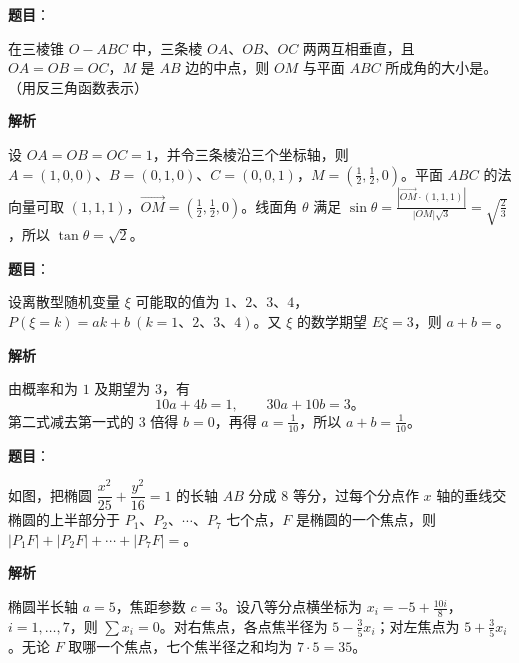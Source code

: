 \begin{answer}

\textbf{题目}：

在三棱锥 $O-ABC$ 中，三条棱 $OA\text{、}OB\text{、}OC$ 两两互相垂直，且 $OA=OB=OC$，$M$ 是 $AB$ 边的中点，则 $OM$ 与平面 $ABC$ 所成角的大小是\gkblank{}。（用反三角函数表示）

\textbf{解析}

设 $OA=OB=OC=1$，并令三条棱沿三个坐标轴，则 $A=(1,0,0)\text{、}B=(0,1,0)\text{、}C=(0,0,1)$，$M=(\frac12,\frac12,0)$。平面 $ABC$ 的法向量可取 $(1,1,1)$，$\overrightarrow{OM}=(\frac12,\frac12,0)$。线面角 $\theta$ 满足 $\sin\theta=\frac{|\overrightarrow{OM}\cdot(1,1,1)|}{|OM|\sqrt3}=\sqrt{\frac23}$，所以 $\tan\theta=\sqrt2$。


\end{answer}
\begin{answer}

\textbf{题目}：

设离散型随机变量 $\xi$ 可能取的值为 $1\text{、}2\text{、}3\text{、}4$，$P(\xi=k)=ak+b\ (k=1\text{、}2\text{、}3\text{、}4)$。又 $\xi$ 的数学期望 $E\xi=3$，则 $a+b=$\gkblank{}。

\textbf{解析}

由概率和为 $1$ 及期望为 $3$，有
\nopagebreak[4]
\[
10a+4b=1,\qquad30a+10b=3\mbox{。}
\]
第二式减去第一式的 $3$ 倍得 $b=0$，再得 $a=\frac1{10}$，所以 $a+b=\frac1{10}$。


\end{answer}
\begin{answer}

\textbf{题目}：

如图，把椭圆 $\dfrac{x^2}{25}+\dfrac{y^2}{16}=1$ 的长轴 $AB$ 分成 $8$ 等分，过每个分点作 $x$ 轴的垂线交椭圆的上半部分于 $P_1\text{、}P_2\text{、}\cdots\text{、}P_7$ 七个点，$F$ 是椭圆的一个焦点，则 $|P_1F|+|P_2F|+\cdots+|P_7F|=$\gkblank{}。
\nopagebreak[4]
\begin{center}\end{center}
\nopagebreak[4]
\textbf{解析}

椭圆半长轴 $a=5$，焦距参数 $c=3$。设八等分点横坐标为 $x_i=-5+\frac{10i}{8}$，$i=1,\ldots,7$，则 $\sum x_i=0$。对右焦点，各点焦半径为 $5-\frac35x_i$；对左焦点为 $5+\frac35x_i$。无论 $F$ 取哪一个焦点，七个焦半径之和均为 $7\cdot5=35$。


\end{answer}

